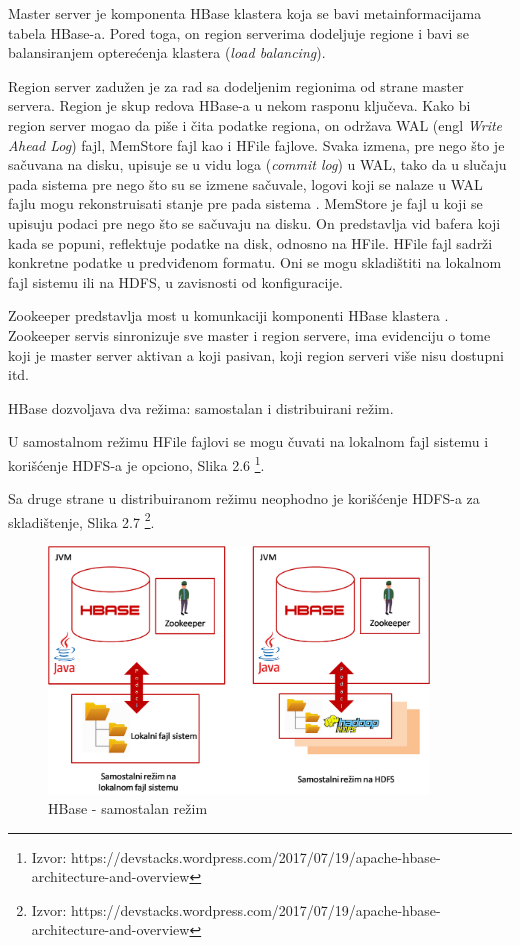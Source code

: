 \documentclass[12pt,oneside]{memoir}
\begin{document}
Master server  je komponenta HBase klastera koja se bavi metainformacijama tabela HBase-a. Pored toga, on region serverima dodeljuje regione i bavi se balansiranjem opterećenja klastera (\textit{load balancing}).

Region server zadužen je za rad sa dodeljenim regionima od strane master servera. Region je skup redova HBase-a u nekom rasponu ključeva. Kako bi region server mogao da piše i čita podatke regiona, on održava WAL (engl \textit{Write Ahead Log}) fajl, MemStore fajl kao i HFile fajlove. Svaka izmena, pre nego što je sačuvana na disku, upisuje se u vidu loga (\textit{commit log}) u WAL, tako da u slučaju pada sistema pre nego što su se izmene sačuvale, logovi koji se nalaze u WAL fajlu mogu rekonstruisati stanje pre pada sistema \cite{wal}. MemStore je fajl u koji se upisuju podaci pre nego što se sačuvaju na disku. On predstavlja vid bafera koji kada se popuni, reflektuje podatke na disk, odnosno na HFile. HFile fajl sadrži konkretne podatke u predviđenom formatu. Oni se mogu skladištiti na lokalnom fajl sistemu ili na HDFS, u zavisnosti od konfiguracije.

Zookeeper predstavlja most u komunkaciji komponenti HBase klastera \cite{zookeeper}. Zookeeper servis  sinronizuje sve master i region servere, ima evidenciju o tome koji je master server aktivan a koji pasivan, koji region serveri više nisu dostupni itd.

HBase dozvoljava dva režima: samostalan i distribuirani režim.

U samostalnom režimu HFile fajlovi se mogu čuvati na lokalnom fajl sistemu i korišćenje HDFS-a je opciono, Slika 2.6  \footnote{Izvor: https://devstacks.wordpress.com/2017/07/19/apache-hbase-architecture-and-overview}.

Sa druge strane u distribuiranom režimu neophodno je korišćenje HDFS-a za skladištenje, Slika 2.7 \footnote{Izvor: https://devstacks.wordpress.com/2017/07/19/apache-hbase-architecture-and-overview}. 

\begin{figure}[!ht]
  \centering
  \includegraphics[width=0.9\textwidth]{hbase-standalone.png}
  \caption{HBase - samostalan režim }
  \label{fig:grafikon}
\end{figure}
\end{document}
